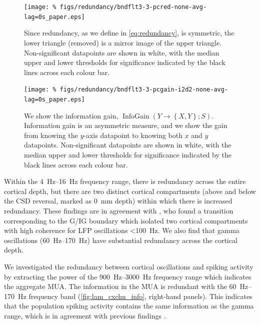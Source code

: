 \begin{figure}[htbp]
    \centering
    \texttt{[image: \%
figs/redundancy/bndflt3-3-pcred-none-avg-lag=0s\_paper.eps]}
%
\caption{
Since redundancy, as we define in \autoref{eq:redundancy}, is symmetric, the lower triangle (removed) is a mirror image of the upper triangle.
Non-significant datapoints are shown in white, with the median upper and lower thresholds for significance indicated by the black lines across each colour bar.
}%
\label{fig:lam_cxchn_info}
\label{fig:lam_cxchn_red}
%
\end{figure}

\begin{figure}[htbp]
    \centering
    \texttt{[image: \%
figs/redundancy/bndflt3-3-pcgain-i2d2-none-avg-lag=0s\_paper.eps]}
%
\caption{
We show the information gain, $\operatorname{InfoGain}\left(Y\to\left\{X,Y\right\};S\right)$.
Information gain is an asymmetric measure, and we show the gain from knowing the $y$-axis datapoint to knowing both $x$ and $y$ datapoints.
Non-significant datapoints are shown in white, with the median upper and lower thresholds for significance indicated by the black lines across each colour bar.
}%
\label{fig:lam_cxchn_infogain}
\label{fig:lam_cxchn_gain}
%
\end{figure}

Within the \SIrange{4}{16}{Hz} frequency range, there is redundancy across the entire cortical depth, but there are two distinct cortical compartments (above and below the \ac{CSD} reversal, marked as \SI{0}{mm} depth) within which there is increased redundancy.
These findings are in agreement with \citet{Maier2010}, who found a transition corresponding to the \ac{G}/\ac{IG} boundary which isolated two cortical compartments with high coherence for \ac{LFP} oscillations \SI{<100}{Hz}.
We also find that gamma oscillations (\SIrange{60}{170}{Hz}) have substantial redundancy across the cortical depth.

We investigated the redundancy between cortical oscillations and spiking activity by extracting the power of the \SIrange{900}{3000}{Hz} frequency range which indicates the aggregate \acf{MUA}.
The information in the \ac{MUA} is redundant with the \SIrange{60}{170}{Hz} frequency band (\autoref{fig:lam_cxchn_info}, right-hand panels).
This indicates that the population spiking activity contains the same information as the gamma range, which is in agreement with previous findings \citep{Belitski2008}.

